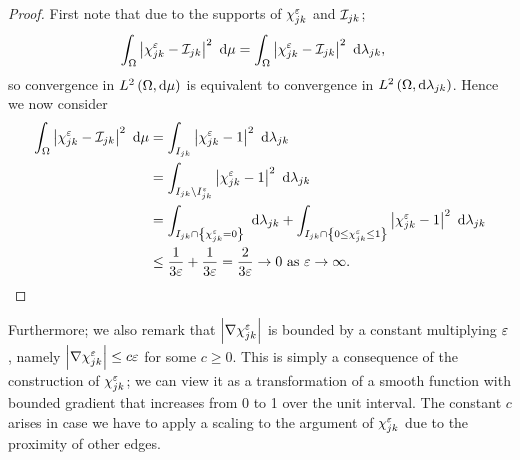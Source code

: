\begin{proof}
	First note that due to the supports of $\chi_{jk}^\varepsilon$ and $\mathcal{I}_{jk}$;
	\begin{align*}
		\int_{\Omega}\left\lvert  \chi_{jk}^\varepsilon - \mathcal{I}_{jk}  \right\rvert^2 \ \mathrm{d}\mu
		&= \int_{\Omega}\left\lvert  \chi_{jk}^\varepsilon - \mathcal{I}_{jk}  \right\rvert^2 \ \mathrm{d}\lambda_{jk},
	\end{align*}
	so convergence in $L^{2}\left( \Omega,\mathrm{d}\mu \right)$ is equivalent to convergence in $L^{2}\left( \Omega,\mathrm{d}\lambda_{jk} \right)$.
	Hence we now consider
	\begin{align*}
		\int_{\Omega}\left\lvert  \chi_{jk}^\varepsilon - \mathcal{I}_{jk}  \right\rvert^2 \ \mathrm{d}\mu
		&= \int_{I_{jk}}\left\lvert  \chi_{jk}^\varepsilon - 1  \right\rvert^2 \ \mathrm{d}\lambda_{jk} \\
		&= \int_{I_{jk}\setminus I_{jk}^\varepsilon}\left\lvert  \chi_{jk}^\varepsilon - 1  \right\rvert^2 \ \mathrm{d}\lambda_{jk} \\
		&= \int_{I_{jk}\cap\left\{ \chi_{jk}^\varepsilon = 0 \right\}} \ \mathrm{d}\lambda_{jk}
		+ \int_{I_{jk}\cap\left\{ 0\leq\chi_{jk}^\varepsilon \leq 1 \right\}}\left\lvert  \chi_{jk}^\varepsilon - 1  \right\rvert^2 \ \mathrm{d}\lambda_{jk} \\
		&\leq \frac{1}{3\varepsilon} + \frac{1}{3\varepsilon} = \frac{2}{3\varepsilon} \rightarrow 0 \ \text{as} \ \varepsilon \rightarrow\infty.
	\end{align*}
\end{proof}
Furthermore; we also remark that $\left\lvert \nabla\chi_{jk}^\varepsilon \right\rvert$ is bounded by a constant multiplying $\varepsilon$, namely $\left\lvert \nabla\chi_{jk}^\varepsilon \right\rvert \leq c\varepsilon$ for some $c\geq0$.
This is simply a consequence of the construction of $\chi_{jk}^\varepsilon$; we can view it as a transformation of a smooth function with bounded gradient that increases from 0 to 1 over the unit interval.
The constant $c$ arises in case we have to apply a scaling to the argument of $\chi_{jk}^\varepsilon$ due to the proximity of other edges. \newline

